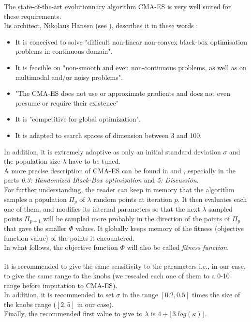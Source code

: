The state-of-the-art evolutionnary algorithm CMA-ES is very well suited for these requirements.\\
Its architect, Nikolaus Hansen (see \cite{cmaintro}), describes it in these words :
\begin{itemize}
	\item It is conceived to solve "difficult non-linear non-convex black-box optimisation problems in continuous domain". 
	\item It is feasible on "non-smooth and even non-continuous problems, as well as on multimodal and/or noisy problems".
	\item "The CMA-ES does not use or approximate gradients and does not even presume or require their existence"
	\item It is "competitive for global optimization".
	\item It is adapted to search spaces of dimension between 3 and 100.
\end{itemize}
In addition, it is extremely adaptive as only an initial standard deviation $\sigma$ and the population size $\lambda$ have to be tuned.\\
A more precise description of CMA-ES can be found in \cite{cmaes} and \cite{cmatuto}, especially in the parts \emph{0.3: Randomized Black-Box optimization} and \emph{5: Discussion}.\\
For further understanding, the reader can keep in memory that the algorithm samples a population $\Pi_{p}$ of $\lambda$ random points at iteration $p$. It then evaluates each one of them, and modifies its internal parameters so that the next $\lambda$ sampled points $\Pi_{p+1}$ will be sampled more probably in the direction of the points of $\Pi_{p}$ that gave the smaller $\Phi$ values. It globally keeps memory of the fitness (objective function value) of the points it encountered.\\
In what follows, the objective function $\Phi$ will also be called \emph{fitness function}.\\
\\
It is recommended to give the same sensitivity to the parameters i.e., in our case, to give the same range to the knobs (we rescaled each one of them to a 0-10 range before imputation to CMA-ES).\\
In addition, it is recommended to set $\sigma$ in the range $[0.2,0.5]$ times the size of the knobs range ($[2,5]$ in our case).\\
Finally, the recommended first value to give to $\lambda$ is $4+\lfloor3.log(\kappa)\rfloor$.

